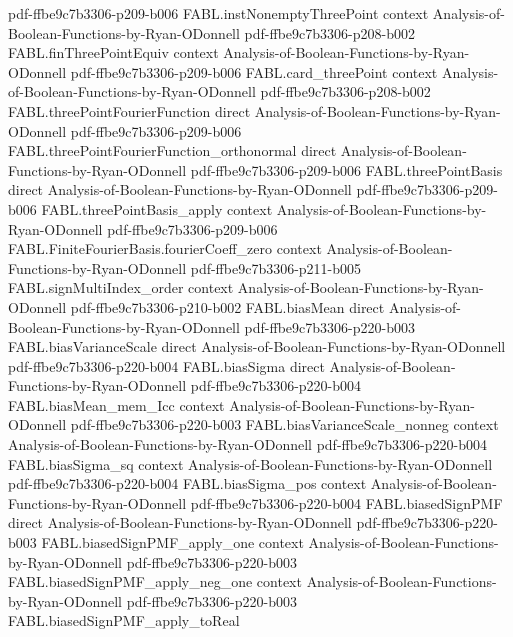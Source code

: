 \begin{theorem}
{    pdf-ffbe9c7b3306-p209-b006}
\proofstep
  {FABL.instNonemptyThreePoint}
  {context}
  {Analysis-of-Boolean-Functions-by-Ryan-ODonnell}
  {pdf-ffbe9c7b3306-p208-b002}
\proofstep
  {FABL.finThreePointEquiv}
  {context}
  {Analysis-of-Boolean-Functions-by-Ryan-ODonnell}
  {pdf-ffbe9c7b3306-p209-b006}
\proofstep
  {FABL.card_threePoint}
  {context}
  {Analysis-of-Boolean-Functions-by-Ryan-ODonnell}
  {pdf-ffbe9c7b3306-p208-b002}
\proofstep
  {FABL.threePointFourierFunction}
  {direct}
  {Analysis-of-Boolean-Functions-by-Ryan-ODonnell}
  {pdf-ffbe9c7b3306-p209-b006}
\proofstep
  {FABL.threePointFourierFunction_orthonormal}
  {direct}
  {Analysis-of-Boolean-Functions-by-Ryan-ODonnell}
  {pdf-ffbe9c7b3306-p209-b006}
\proofstep
  {FABL.threePointBasis}
  {direct}
  {Analysis-of-Boolean-Functions-by-Ryan-ODonnell}
  {pdf-ffbe9c7b3306-p209-b006}
\proofstep
  {FABL.threePointBasis_apply}
  {context}
  {Analysis-of-Boolean-Functions-by-Ryan-ODonnell}
  {pdf-ffbe9c7b3306-p209-b006}
\proofstep
  {FABL.FiniteFourierBasis.fourierCoeff_zero}
  {context}
  {Analysis-of-Boolean-Functions-by-Ryan-ODonnell}
  {pdf-ffbe9c7b3306-p211-b005}
\proofstep
  {FABL.signMultiIndex_order}
  {context}
  {Analysis-of-Boolean-Functions-by-Ryan-ODonnell}
  {pdf-ffbe9c7b3306-p210-b002}
\proofstep
  {FABL.biasMean}
  {direct}
  {Analysis-of-Boolean-Functions-by-Ryan-ODonnell}
  {pdf-ffbe9c7b3306-p220-b003}
\proofstep
  {FABL.biasVarianceScale}
  {direct}
  {Analysis-of-Boolean-Functions-by-Ryan-ODonnell}
  {pdf-ffbe9c7b3306-p220-b004}
\proofstep
  {FABL.biasSigma}
  {direct}
  {Analysis-of-Boolean-Functions-by-Ryan-ODonnell}
  {pdf-ffbe9c7b3306-p220-b004}
\proofstep
  {FABL.biasMean_mem_Icc}
  {context}
  {Analysis-of-Boolean-Functions-by-Ryan-ODonnell}
  {pdf-ffbe9c7b3306-p220-b003}
\proofstep
  {FABL.biasVarianceScale_nonneg}
  {context}
  {Analysis-of-Boolean-Functions-by-Ryan-ODonnell}
  {pdf-ffbe9c7b3306-p220-b004}
\proofstep
  {FABL.biasSigma_sq}
  {context}
  {Analysis-of-Boolean-Functions-by-Ryan-ODonnell}
  {pdf-ffbe9c7b3306-p220-b004}
\proofstep
  {FABL.biasSigma_pos}
  {context}
  {Analysis-of-Boolean-Functions-by-Ryan-ODonnell}
  {pdf-ffbe9c7b3306-p220-b004}
\proofstep
  {FABL.biasedSignPMF}
  {direct}
  {Analysis-of-Boolean-Functions-by-Ryan-ODonnell}
  {pdf-ffbe9c7b3306-p220-b003}
\proofstep
  {FABL.biasedSignPMF_apply_one}
  {context}
  {Analysis-of-Boolean-Functions-by-Ryan-ODonnell}
  {pdf-ffbe9c7b3306-p220-b003}
\proofstep
  {FABL.biasedSignPMF_apply_neg_one}
  {context}
  {Analysis-of-Boolean-Functions-by-Ryan-ODonnell}
  {pdf-ffbe9c7b3306-p220-b003}
\proofstep
  {FABL.biasedSignPMF_apply_toReal}

\end{theorem}
